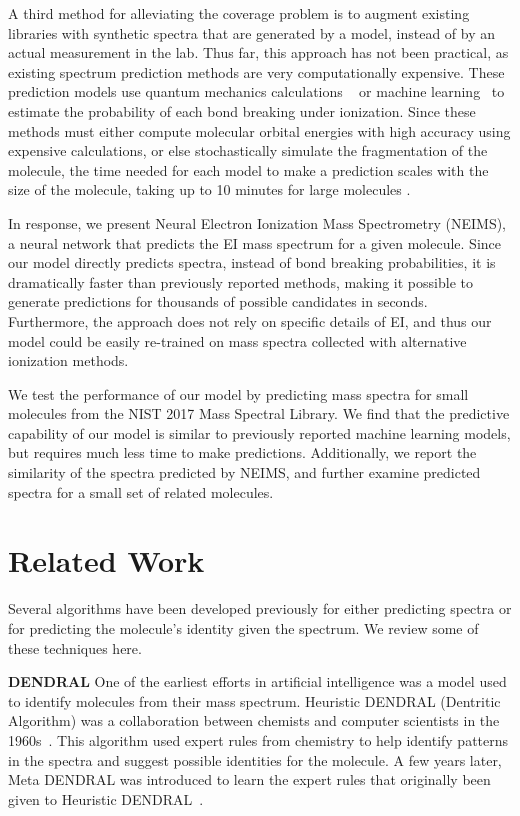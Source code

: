 A third method for alleviating the coverage problem is to 
augment existing libraries with synthetic spectra that are generated by a model, instead of by an actual measurement in the lab. Thus far, this approach has not been practical, as existing spectrum prediction methods are very computationally expensive. These prediction models use quantum mechanics calculations ~\cite{bauer2016compute,grimme2013towards,Guerra_BEB_model} or machine learning~\cite{allen2016computational} to estimate the probability of each bond breaking under ionization. Since these methods must either compute molecular orbital energies with high accuracy using expensive calculations, or else stochastically simulate the fragmentation of the molecule, the time needed for each model to make a prediction scales with the size of the molecule, taking up to 10 minutes for large molecules \cite{allen2016computational}.

In response, we present Neural Electron Ionization Mass Spectrometry (NEIMS), a neural network that predicts the EI mass spectrum for a given molecule. Since our model directly predicts spectra, instead of bond breaking probabilities, it is dramatically faster than previously reported methods, making it possible to generate predictions for thousands of possible candidates in seconds. Furthermore, the approach does not rely on specific details of EI, and thus our model could be easily re-trained on mass spectra collected with alternative ionization methods.

We test the performance of our model by predicting mass spectra for small molecules from the NIST 2017 Mass Spectral Library. We find that the predictive capability of our model is similar to previously reported machine learning models, but requires much less time to make predictions. Additionally, we report the similarity of the spectra predicted by NEIMS, and further examine predicted spectra for a small set of related molecules.

\section{Related Work}
\label{sec:related-work}
Several algorithms have been developed previously for either predicting spectra or for predicting the molecule's identity given the spectrum. We review some of these techniques here.

\textbf{DENDRAL} One of the earliest efforts in artificial intelligence was a model used to identify molecules from their mass spectrum. Heuristic DENDRAL (Dentritic Algorithm) was a collaboration between chemists and computer scientists in the 1960s~\cite{buchanan1981dendral}. This algorithm used expert rules from chemistry to help identify patterns in the spectra and suggest possible identities for the molecule. A few years later, Meta DENDRAL was introduced to learn the expert rules that originally been given to Heuristic DENDRAL~\cite{lindsay1993dendral}.
    
